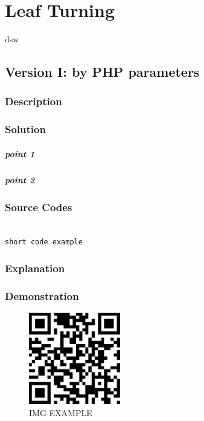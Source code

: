 \documentclass{book}
\begin{document}
\chapter{Leaf Turning}

dsw

\section{Version I: by PHP parameters}

\subsection{Description}

\subsection{Solution}

\paragraph{point 1}

\paragraph{point 2}

\subsection{Source Codes}

\begin{minipage}[r]{15em}
\begin{verbatim}

short code example

\end{verbatim}
\end{minipage}

\subsection{Explanation}

\subsection{Demonstration}

\begin{figure}[H]
\centering
\includegraphics[height=4.0cm,width=4.0cm]{img/dsw_1.jpg}
\caption{IMG EXAMPLE}
\end{figure}
\end{document}
